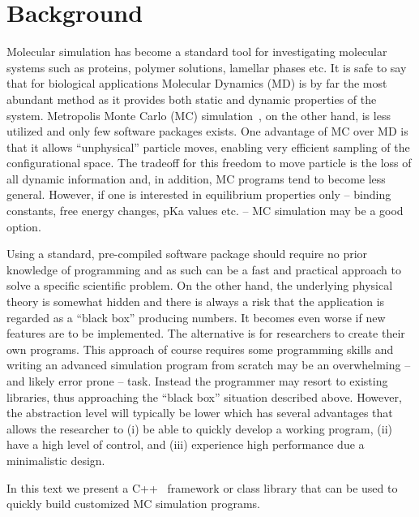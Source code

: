 \documentclass[10pt]{bmc_article}
\newenvironment{bmcformat}{\fussy\setboolean{publ}{true}}{\fussy}
\begin{document}
\begin{bmcformat}
\section*{Background}
Molecular simulation has become a standard tool for investigating molecular systems such as proteins, polymer solutions, lamellar phases etc.
It is safe to say that for biological applications Molecular Dynamics (MD) is by far the most abundant method as it provides both static and dynamic properties of the system.
Metropolis Monte Carlo (MC) simulation~\cite{metropolis:53}, on the other hand, is less utilized and only few software packages exists\cite{Kamberaj:2001fk,carlsson:01,Jie-Hu:2006lr}. One advantage of MC over MD is that it allows ``unphysical'' particle moves, enabling very efficient sampling of the configurational space\cite{frenkel}. The tradeoff for this freedom to move particle is the loss of all dynamic information and, in addition, MC programs tend to become less general.
However, if one is interested in equilibrium properties only -- binding constants, free energy changes, pKa values etc. -- MC simulation may be a good option.

Using a standard, pre-compiled software package should require no prior knowledge of programming and as such can be a fast and practical approach to solve a specific scientific problem. On the other hand, the underlying physical theory is somewhat hidden and there is always a risk that the application is regarded as a ``black box'' producing numbers. It becomes even worse if new features are to be implemented.
The alternative is for researchers to create their own programs. This approach of course requires some programming skills and writing an advanced simulation program from scratch may be an overwhelming -- and likely error prone -- task.
Instead the programmer may resort to existing libraries, thus approaching the ``black box'' situation described above. However, the abstraction level will typically be lower which has several advantages that allows the researcher to
(i) be able to quickly develop a working program,
(ii) have a high level of control, and
(iii) experience high performance due a minimalistic design.

In this text we present a C++~\cite{stroustrup:97} framework or class library that can be used to quickly build customized MC simulation programs.




\end{bmcformat}
\end{document}
